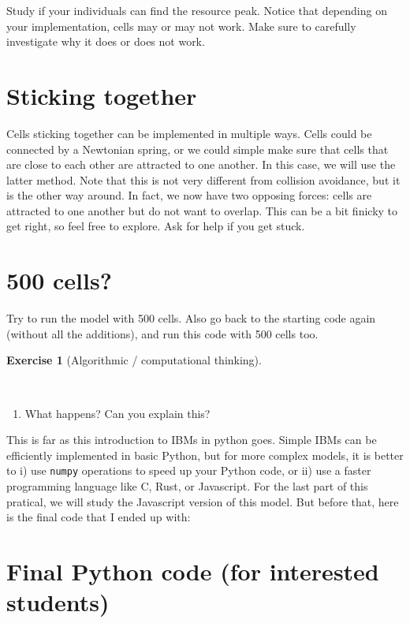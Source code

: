 \documentclass[
  letterpaper,
  DIV=11,
  numbers=noendperiod]{scrreprt}
\providecommand{\tightlist}{%
  \setlength{\itemsep}{0pt}\setlength{\parskip}{0pt}}\usepackage{longtable,booktabs,array}
\theoremstyle{definition}
\newtheorem{exercise}{Exercise}[chapter]
\theoremstyle{remark}
\begin{document}
Study if your individuals can find the resource peak. Notice that
depending on your implementation, cells may or may not work. Make sure
to carefully investigate why it does or does not work.

\section{Sticking together}\label{sec-sticking}

Cells sticking together can be implemented in multiple ways. Cells could
be connected by a Newtonian spring, or we could simple make sure that
cells that are close to each other are attracted to one another. In this
case, we will use the latter method. Note that this is not very
different from collision avoidance, but it is the other way around. In
fact, we now have two opposing forces: cells are attracted to one
another but do not want to overlap. This can be a bit finicky to get
right, so feel free to explore. Ask for help if you get stuck.

\section{500 cells?}\label{cells}

Try to run the model with 500 cells. Also go back to the starting code
again (without all the additions), and run this code with 500 cells too.

\begin{exercise}[Algorithmic / computational
thinking]\protect\hypertarget{exr-steering}{}\label{exr-steering}

~

\begin{enumerate}
\def\labelenumi{\alph{enumi}.}
\tightlist
\item
  What happens? Can you explain this?
\end{enumerate}

\end{exercise}

This is far as this introduction to IBMs in python goes. Simple IBMs can
be efficiently implemented in basic Python, but for more complex models,
it is better to i) use \texttt{numpy} operations to speed up your Python
code, or ii) use a faster programming language like C, Rust, or
Javascript. For the last part of this pratical, we will study the
Javascript version of this model. But before that, here is the final
code that I ended up with:

\section{Final Python code (for interested
students)}\label{final-python-code-for-interested-students}
\end{document}

